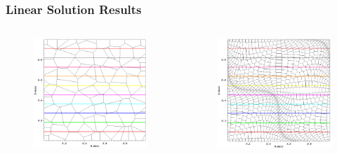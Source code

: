 \documentclass[]{beamer}
\begin{document}
\begin{frame}[t]\frametitle{Linear Solution Results}
    	\begin{columns}
		\begin{column}{.5\textwidth}
			\begin{figure}[t]
				\centering
				\includegraphics[width=.9\textwidth]{images/poly_lin_contour.png}
			\end{figure}
		\end{column}
		\begin{column}{.5\textwidth}
			\begin{figure}[t]
				\centering
				\includegraphics[width=.9\textwidth]{images/sine_poly_lin_contour.png}
			\end{figure}
		\end{column}
	\end{columns}
\end{frame}
\end{document}

